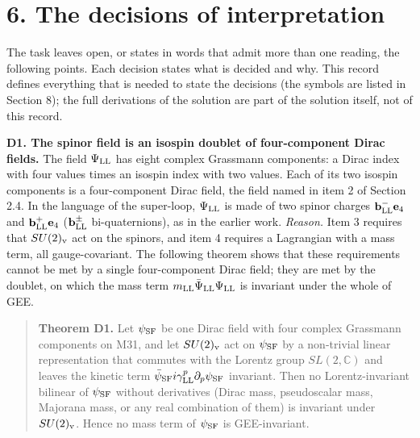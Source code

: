 \documentclass[
  10pt,
]{article}
\begin{document}
\hypertarget{the-decisions-of-interpretation}{%
\section{6. The decisions of
interpretation}\label{the-decisions-of-interpretation}}

The task leaves open, or states in words that admit more than one
reading, the following points. Each decision states what is decided and
why. This record defines everything that is needed to state the
decisions (the symbols are listed in Section 8); the full derivations of
the solution are part of the solution itself, not of this record.

\textbf{D1. The spinor field is an isospin doublet of four-component
Dirac fields.} The field \(\Psi_{\rm LL}\) has eight complex Grassmann
components: a Dirac index with four values times an isospin index with
two values. Each of its two isospin components is a four-component Dirac
field, the field named in item 2 of Section 2.4. In the language of the
super-loop, \(\Psi_{\rm LL}\) is made of two spinor charges
\(\mathbf b^-_{\rm LL}\mathbf e_4\) and
\(\mathbf b^+_{\rm LL}\mathbf e_4\) (\(\mathbf b^\pm_{\rm LL}\)
bi-quaternions), as in the earlier work. \emph{Reason.} Item 3 requires
that \(SU(2)_{\rm v}\) act on the spinors, and item 4 requires a
Lagrangian with a mass term, all gauge-covariant. The following theorem
shows that these requirements cannot be met by a single four-component
Dirac field; they are met by the doublet, on which the mass term
\(m_{\rm LL}\bar\Psi_{\rm LL}\Psi_{\rm LL}\) is invariant under the
whole of GEE.

\begin{quote}
\textbf{Theorem D1.} Let \(\psi_{\rm SF}\) be one Dirac field with four
complex Grassmann components on M31, and let \(SU(2)_{\rm v}\) act on
\(\psi_{\rm SF}\) by a non-trivial linear representation that commutes
with the Lorentz group \(SL(2,\mathbb C)\) and leaves the kinetic term
\(\bar\psi_{\rm SF}i\gamma^p_{\rm LL}\partial_p\psi_{\rm SF}\)
invariant. Then no Lorentz-invariant bilinear of \(\psi_{\rm SF}\)
without derivatives (Dirac mass, pseudoscalar mass, Majorana mass, or
any real combination of them) is invariant under \(SU(2)_{\rm v}\).
Hence no mass term of \(\psi_{\rm SF}\) is GEE-invariant.
\end{quote}
\end{document}
